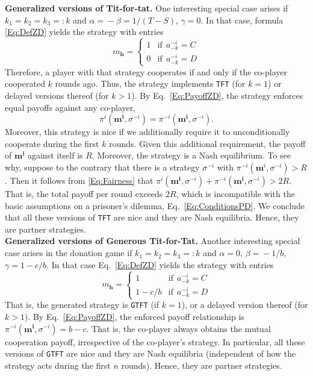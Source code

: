 \documentclass[11pt]{article}
\theoremstyle{plainCl1}
\theoremstyle{plainCl2}
\def\tft{\texttt{TFT}}
\def\gtft{\texttt{GTFT}}
\begin{document}
\noindent
{\bf Generalized versions of Tit-for-tat.} 
One interesting special case arises if $k_1\!=\!k_2\!=\!k_3\!=:\!k$ and $\alpha
\!=\! -\beta \!=\!1/(T\!-\!S)$, $\gamma \!=\! 0$. In that case, formula
\eqref{Eq:DefZD} yields the strategy with entries
\begin{equation*}
m_\mathbf{h} = \left\{
\begin{array}{ll}
1	&\text{if}~~a^{-i}_{-k}=C\\[0.2cm]
0	&\text{if}~~a^{-i}_{-k}=D
\end{array}
\right.
\end{equation*}
Therefore, a player with that strategy cooperates if and only if the co-player cooperated $k$ rounds ago. 
Thus, the strategy implements \tft{} (for $k\!=\!1$) or delayed versions thereof (for $k\!>\!1$). 
By Eq.~\eqref{Eq:PayoffZD}, the strategy enforces equal payoffs against any co-player, 
\begin{equation} \label{Eq:Fairness}
\pi^i(\mathbf{m^i},\sigma^{-i}) \!=\! \pi^{-i}(\mathbf{m^i},\sigma^{-i}).
\end{equation} 
Moreover, this strategy is nice if we additionally require it to unconditionally cooperate during the first $k$ rounds. 
Given this additional requirement, the payoff of $\mathbf{m^i}$ against itself is $R$. 
Moreover, the strategy is a Nash equilibrium. To see why, suppose to the contrary that there is a strategy $\sigma^{-i}$ with $\pi^{-i}(\mathbf{m}^i,\sigma^{-i}) \!>\! R$. Then it follows from \eqref{Eq:Fairness} that $\pi^i(\mathbf{m^i},\sigma^{-i}) \!+\! \pi^{-i}(\mathbf{m^i},\sigma^{-i})\!>\!2R$. That is, the total  payoff per round exceeds $2R$, which is incompatible with the basic assumptions on a prisoner's dilemma, Eq.~\eqref{Eq:ConditionsPD}. We conclude that all these versions of \tft{} are nice and they are Nash equilibria. Hence, they are partner strategies.\\

\noindent
{\bf Generalized versions of Generous Tit-for-Tat.}
Another interesting special case arises in the donation game if $k_1\!=\!k_2\!=\!k_3\!=:\!k$ and
$\alpha\!=\!0$, $\beta\!=\!-1/b$, $\gamma\!=\!1\!-\!c/b$. In that case
Eq.~\eqref{Eq:DefZD} yields the strategy with entries
\begin{equation*}
m_\mathbf{h} = \left\{
\begin{array}{ll}
1	&\text{if}~~a^{-i}_{-k}=C\\[0.2cm]
1-c/b	&\text{if}~~a^{-i}_{-k}=D
\end{array}
\right.
\end{equation*}
That is, the generated strategy is \gtft{} (if $k\!=\!1$), or a delayed version
thereof (for $k\!>\!1$). By Eq.~\eqref{Eq:PayoffZD}, the enforced payoff
relationship is $\pi^{-i}(\mathbf{m^{i}}, \sigma^{-i})\!=\!b\!-\!c$. 
That is, the co-player always obtains the mutual cooperation payoff, irrespective of the co-player's strategy. 
In particular, all these versions of \gtft{} are nice and they are Nash equilibria (independent of how the strategy acts during the first $n$ rounds). 
Hence, they are partner strategies.
\end{document}
